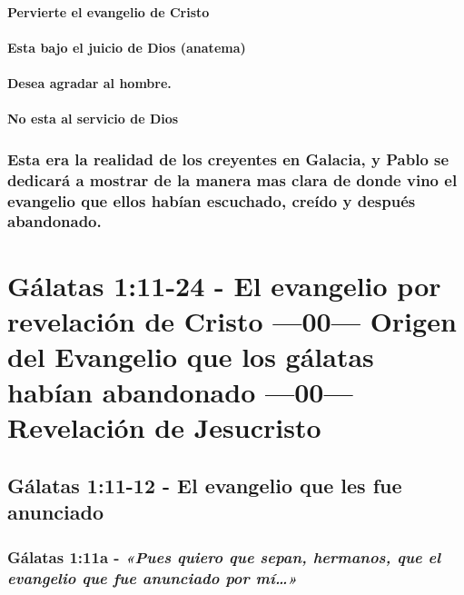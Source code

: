 \documentclass[11a pt,twoside]{article}
\newcommand{\scripture}[1]{%
  {\fontsize{12pt}{16pt}\selectfont\ScriptureFont\itshape #1}%
}
\let\oldsection\section
\renewcommand{\section}{\needspace{6\baselineskip}\oldsection}
\let\oldsubsection\subsection
\renewcommand{\subsection}{\needspace{5\baselineskip}\oldsubsection}
\let\oldsubsubsection\subsubsection
\renewcommand{\subsubsection}{\needspace{4\baselineskip}\oldsubsubsection}
\let\oldparagraph\paragraph
\renewcommand{\paragraph}{\needspace{3\baselineskip}\oldparagraph}
\begin{document}
\paragraph{Pervierte el evangelio de
Cristo}\label{pervierte-el-evangelio-de-cristo}

\paragraph{Esta bajo el juicio de Dios
(anatema)}\label{esta-bajo-el-juicio-de-dios-anatema}

\paragraph{Desea agradar al hombre.}\label{desea-agradar-al-hombre.}

\paragraph{No esta al servicio de
Dios}\label{no-esta-al-servicio-de-dios}

\subsubsection{Esta era la realidad de los creyentes en Galacia, y Pablo
se dedicará a mostrar de la manera mas clara de donde vino el evangelio
que ellos habían escuchado, creído y después
abandonado.}\label{esta-era-la-realidad-de-los-creyentes-en-galacia-y-pablo-se-dedicaruxe1-a-mostrar-de-la-manera-mas-clara-de-donde-vino-el-evangelio-que-ellos-habuxedan-escuchado-creuxeddo-y-despuuxe9s-abandonado.}

\section{Gálatas 1:11-24 - El evangelio por revelación de Cristo
---00--- Origen del Evangelio que los gálatas habían abandonado ---00---
Revelación de
Jesucristo}\label{guxe1latas-111-24---el-evangelio-por-revelaciuxf3n-de-cristo-00-origen-del-evangelio-que-los-guxe1latas-habuxedan-abandonado-00-revelaciuxf3n-de-jesucristo}

\subsection{Gálatas 1:11-12 - El evangelio que les fue
anunciado}\label{guxe1latas-111-12---el-evangelio-que-les-fue-anunciado}

\subsubsection{\texorpdfstring{Gálatas 1:11a -
\scripture{«Pues quiero que sepan, hermanos, que el evangelio que fue anunciado por mí…»}}{Gálatas 1:11a - }}\label{guxe1latas-111a---pues-quiero-que-sepan-hermanos-que-el-evangelio-que-fue-anunciado-por-muxed}
\end{document}
